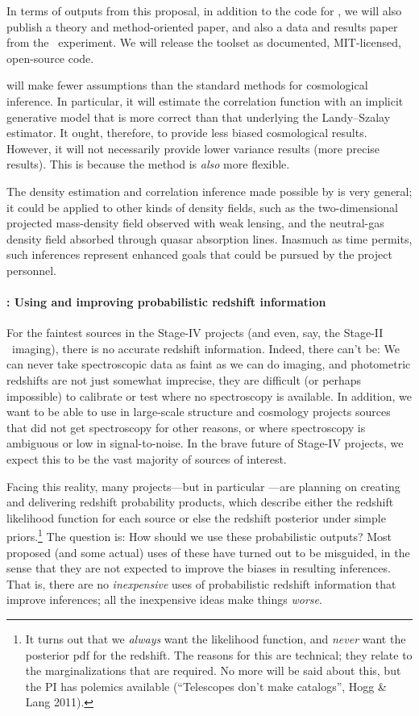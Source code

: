 \documentclass[12pt]{article}
\begin{document}
In terms of outputs from this proposal, in addition to the code for
, we will also publish a theory and method-oriented
paper, and also a data and results paper from the \boss\ experiment.
We will release the toolset as documented, MIT-licensed, open-source
code.

 will make fewer assumptions than the standard
methods for cosmological inference.
In particular, it will estimate the correlation function with an
implicit generative model that is more correct than that underlying
the Landy--Szalay estimator.
It ought, therefore, to provide less biased cosmological results.
However, it will not necessarily provide lower variance results (more
precise results).
This is because the method is \emph{also} more flexible.

The density estimation and correlation inference made possible by
 is very general; it could be applied to other
kinds of density fields, such as the two-dimensional projected
mass-density field observed with weak lensing, and the neutral-gas
density field absorbed through quasar absorption lines.
Inasmuch as time permits, such inferences represent enhanced goals
that could be pursued by the project personnel.

\paragraph{: Using and improving probabilistic redshift information}

For the faintest sources in the Stage-IV projects (and even, say, the
Stage-II \sdss\ imaging), there is no accurate redshift information.
Indeed, there can't be:
We can never take spectroscopic data as faint as we can do imaging,
and photometric redshifts are not just somewhat imprecise, they are
difficult (or perhaps impossible) to calibrate or test where no
spectroscopy is available.
In addition, we want to be able to use in large-scale structure and
cosmology projects sources that did not get spectroscopy for other
reasons, or where spectroscopy is ambiguous or low in signal-to-noise.
In the brave future of Stage-IV projects, we expect this to be the
vast majority of sources of interest.

Facing this reality, many projects---but in particular \lsst---are
planning on creating and delivering redshift probability products,
which describe either the redshift likelihood function for each source
or else the redshift posterior under simple priors.\footnote{It turns
  out that we \emph{always} want the likelihood function, and
  \emph{never} want the posterior pdf for the redshift.  The reasons
  for this are technical; they relate to the marginalizations that are
  required.  No more will be said about this, but the PI has polemics
  available (``Telescopes don't make catalogs'', Hogg \& Lang 2011).}
The question is:  How should we use these probabilistic outputs?
Most proposed (and some actual) uses of these have turned out to be
misguided, in the sense that they are not expected to improve the
biases in resulting inferences.
That is, there are no \emph{inexpensive} uses of probabilistic
redshift information that improve inferences; all the inexpensive
ideas make things \emph{worse}.
\end{document}
